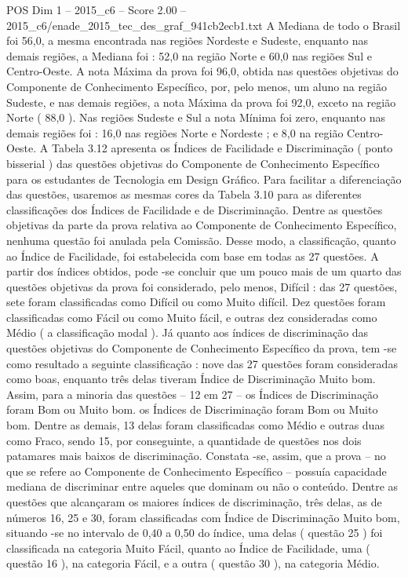 \begin{textsample}{POS Dim 1 – 2015\_c6 – Score 2.00 – 2015\_c6/enade\_2015\_tec\_des\_graf\_941cb2ecb1.txt}
A Mediana de todo o Brasil foi 56,0, a mesma encontrada nas regiões Nordeste e Sudeste, enquanto nas demais regiões, a Mediana foi : 52,0 na região Norte e 60,0 nas regiões Sul e Centro-Oeste.
A nota Máxima da prova foi 96,0, obtida nas questões objetivas do Componente de Conhecimento Específico, por, pelo menos, um aluno na região Sudeste, e nas demais regiões, a nota Máxima da prova foi 92,0, exceto na região Norte ( 88,0 ).
Nas regiões Sudeste e Sul a nota Mínima foi zero, enquanto nas demais regiões foi : 16,0 nas regiões Norte e Nordeste ; e 8,0 na região Centro-Oeste.
A Tabela 3.12 apresenta os Índices de Facilidade e Discriminação ( ponto bisserial ) das questões objetivas do Componente de Conhecimento Específico para os estudantes de Tecnologia em Design Gráfico.
Para facilitar a diferenciação das questões, usaremos as mesmas cores da Tabela 3.10 para as diferentes classificações dos Índices de Facilidade e de Discriminação.
Dentre as questões objetivas da parte da prova relativa ao Componente de Conhecimento Específico, nenhuma questão foi anulada pela Comissão.
Desse modo, a classificação, quanto ao Índice de Facilidade, foi estabelecida com base em todas as 27 questões.
A partir dos índices obtidos, pode -se concluir que um pouco mais de um quarto das questões objetivas da prova foi considerado, pelo menos, Difícil : das 27 questões, sete foram classificadas como Difícil ou como Muito difícil.
Dez questões foram classificadas como Fácil ou como Muito fácil, e outras dez consideradas como Médio ( a classificação modal ).
Já quanto aos índices de discriminação das questões objetivas do Componente de Conhecimento Específico da prova, tem -se como resultado a seguinte classificação : nove das 27 questões foram consideradas como boas, enquanto três delas tiveram Índice de Discriminação Muito bom.
Assim, para a minoria das questões – 12 em 27 – os Índices de Discriminação foram Bom ou Muito bom. os Índices de Discriminação foram Bom ou Muito bom.
Dentre as demais, 13 delas foram classificadas como Médio e outras duas como Fraco, sendo 15, por conseguinte, a quantidade de questões nos dois patamares mais baixos de discriminação.
Constata -se, assim, que a prova – no que se refere ao Componente de Conhecimento Específico – possuía capacidade mediana de discriminar entre aqueles que dominam ou não o conteúdo.
Dentre as questões que alcançaram os maiores índices de discriminação, três delas, as de números 16, 25 e 30, foram classificadas com Índice de Discriminação Muito bom, situando -se no intervalo de 0,40 a 0,50 do índice, uma delas ( questão 25 ) foi classificada na categoria Muito Fácil, quanto ao Índice de Facilidade, uma ( questão 16 ), na categoria Fácil, e a outra ( questão 30 ), na categoria Médio.

\end{textsample}
